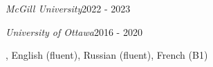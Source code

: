  \textit{McGill University}\hfill 2022 - 2023

 \textit{University of Ottawa}\hfill 2016 - 2020

, English (fluent), Russian (fluent), French (B1)
